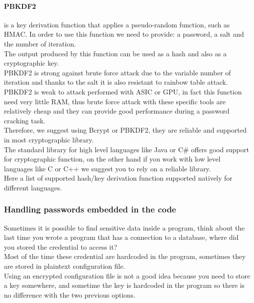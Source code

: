 \paragraph{PBKDF2} is a key derivation function that applies a pseudo-random function, such as HMAC.
In order to use this function we need to provide: a password, a salt and the number of iteration.\\
The output produced by this function can be used as a hash and also as a cryptographic key.\\
PBKDF2 is strong against brute force attack due to the variable number of iteration and thanks to the salt it is also resistant to rainbow table attack.\\
PBKDF2 is weak to attack performed with ASIC or GPU, in fact this function need very little RAM, thus brute force attack with these specific tools are relatively cheap and they can provide good performance during a password cracking task.\\
Therefore, we suggest using Bcrypt or PBKDF2, they are reliable and supported in most cryptographic library.\\
The standard library for high level languages like Java or C\# offers good support for cryptographic function, on the other hand if you work with low level languages like C or C++ we suggest you to rely on a reliable library.\\
Here a list of supported hash/key derivation function supported natively for different languages.\\



\subsubsection{Handling passwords embedded in the code}
Sometimes it is possible to find sensitive data inside a program, think about the last time you wrote a program that has a connection to a database, where did you stored the credential to access it?\\
Most of the time these credential are hardcoded in the program, sometimes they are stored in plaintext configuration file.\\
Using an encrypted configuration file is not a good idea because you need to store a key somewhere, and sometime the key is hardcoded in the program so there is no difference with the two previous options.\\

